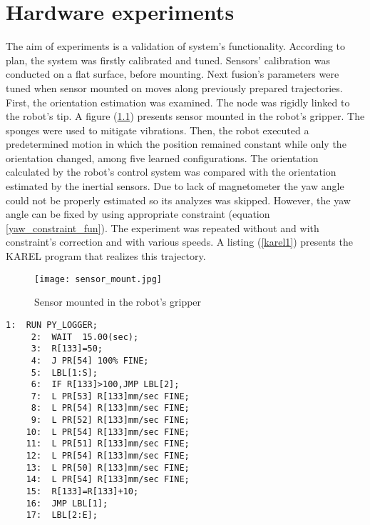 \chapter{Hardware experiments}

The aim of experiments is a validation of system's functionality. According to plan, the system was firstly calibrated and tuned. Sensors' calibration was conducted on a flat surface, before mounting. Next fusion's parameters were tuned when sensor mounted on moves along previously prepared trajectories.\\

 First, the orientation estimation was examined. The node was rigidly linked to the robot's tip. A figure (\ref{sensor_mount}) presents sensor mounted in the robot's gripper. The sponges were used to mitigate vibrations.  Then, the robot executed a predetermined motion in which the position remained constant while only the orientation changed, among five learned configurations. The orientation calculated by the robot's control system was compared with the orientation estimated by the inertial sensors. Due to lack of magnetometer the yaw angle could not be properly estimated so its analyzes was skipped. However, the yaw angle can be fixed by using appropriate constraint (equation \ref{yaw_constraint_fun}). The experiment was repeated without and with constraint's correction and with various speeds. A listing (\ref{karel1}) presents the KAREL program that realizes this trajectory.
 
 \begin{figure}[!h]
 	\centering
 	\texttt{[image: sensor\_mount.jpg]}
 	\caption{Sensor mounted in the robot's gripper}
 	\label{sensor_mount}
 \end{figure}
 
 \begin{lstlisting}[caption={The KAREL program realizing an orientation changes}, captionpos=t, label=karel1]
	 1:  RUN PY_LOGGER;
	 2:  WAIT  15.00(sec);
	 3:  R[133]=50;
	 4:  J PR[54] 100% FINE;
	 5:  LBL[1:S];
	 6:  IF R[133]>100,JMP LBL[2];
	 7:  L PR[53] R[133]mm/sec FINE;
	 8:  L PR[54] R[133]mm/sec FINE;
	 9:  L PR[52] R[133]mm/sec FINE;
	10:  L PR[54] R[133]mm/sec FINE;
	11:  L PR[51] R[133]mm/sec FINE;
	12:  L PR[54] R[133]mm/sec FINE;
	13:  L PR[50] R[133]mm/sec FINE;
	14:  L PR[54] R[133]mm/sec FINE;
	15:  R[133]=R[133]+10;
	16:  JMP LBL[1];
	17:  LBL[2:E];
 \end{lstlisting}


